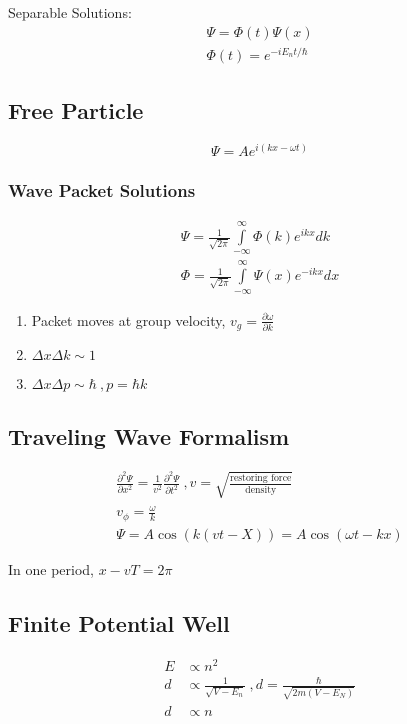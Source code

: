 \documentclass[10pt,letter]{article}
\begin{document}
Separable Solutions: 
\begin{align}
    \Psi = \Phi(t)\Psi(x)\\
    \Phi(t) = e^{-iE_nt/\hbar}
\end{align}

\subsection{Free Particle}
\begin{equation}
 \Psi = Ae^{i(kx-\omega t)} 
\end{equation}

\subsubsection{Wave Packet Solutions}
\begin{align}
 \Psi =  \frac{1}{\sqrt{2\pi}} \int\limits_{-\infty}^\infty \Phi(k) e^{ikx}dk\\
 \Phi =  \frac{1}{\sqrt{2\pi}} \int\limits_{-\infty}^\infty \Psi(x) e^{-ikx}dx
\end{align}

\begin{enumerate}
    \item Packet moves at group velocity, $v_g = \frac{\partial \omega}{\partial k}$ 
    \item $\Delta x\Delta k \sim 1$
    \item $\Delta x \Delta p \sim \hbar~, p = \hbar k$
\end{enumerate}

\subsection{Traveling Wave Formalism}
\begin{align}
    \frac{\partial^2 \Psi}{\partial x^2} = \frac{1}{v^2} \frac{\partial ^2 \Psi}{\partial t^2}~,v=\sqrt{\frac{\textrm{restoring force}}{\textrm{density}}}\\
    v_\phi = \frac{\omega}{k}\\
    \Psi = A\cos(k(vt-X)) = A \cos(\omega t - kx)
\end{align}

In one period, $x-vT = 2\pi$

\subsection{Finite Potential Well}
\begin{align}
 E &\propto n^2\\ 
 d &\propto \frac{1}{\sqrt{V-E_n}}~,d=\frac{\hbar}{\sqrt{2m(V-E_N)}}\\
 d &\propto n
\end{align}
\end{document}
